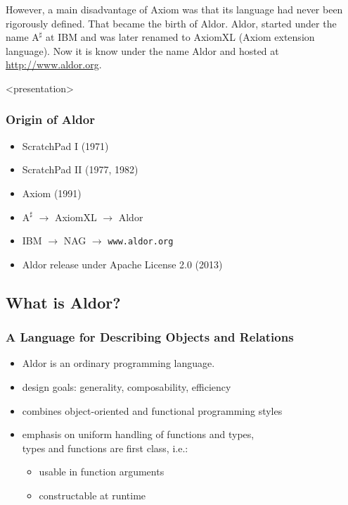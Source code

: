 However, a main disadvantage of Axiom was that its language had never
been rigorously defined. That became the birth of Aldor. Aldor,
started under the name $\mathrm{A}^\sharp$ at IBM and was later renamed to
AxiomXL (Axiom extension language). Now it is know under the name
Aldor and hosted at \url{http://www.aldor.org}.




\begin{frame}<presentation>
  \frametitle{Origin of Aldor}
  \begin{itemize}
  \item ScratchPad I (1971) %
  \item ScratchPad II (1977, %
    1982) %
  \item Axiom (1991)
  \item $\mathrm{A}^\sharp$ $\longrightarrow$ AxiomXL $\longrightarrow$ Aldor
  \item IBM $\longrightarrow$ NAG $\longrightarrow$ \texttt{www.aldor.org}
  \item Aldor release under Apache License 2.0 (2013)
  \end{itemize}
\end{frame}













\subsection{What is Aldor?}

\begin{frame}
  \frametitle{\textbf{A} \textbf{L}anguage for \textbf{D}escribing
    \textbf{O}bjects and \textbf{R}elations}
  \begin{itemize}
  \item Aldor is an ordinary programming language.
  \item design goals: generality, composability, efficiency
  \item combines object-oriented and functional programming styles
  \item emphasis on uniform handling of functions and types,\\
    types and functions are \alert{first class}, i.e.:
    \begin{itemize}
    \item usable in function arguments
    \item constructable at runtime
    \end{itemize}
  \end{itemize}
\end{frame}








